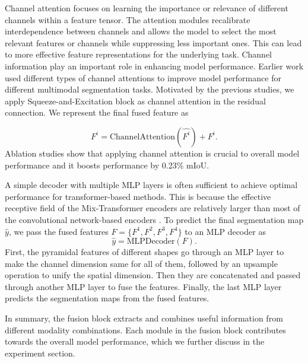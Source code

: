 \documentclass{article}
\begin{document}
Channel attention focuses on learning the importance or relevance of different channels within a feature tensor. The attention modules recalibrate  interdependence between channels and allows the model to select the most relevant features or channels while suppressing less important ones. This can lead to more effective feature representations for the underlying task. Channel information play an important role in enhancing model performance. Earlier work \cite{hu2019acnet, chen2020sa-gate, zhang2023cmx}  used different types of channel attentions to improve model performance for different multimodal segmentation tasks. Motivated by the previous studies, we apply Squeeze-and-Excitation block \cite{hu2019squeezeandexcitation} as channel attention in the residual connection.
We represent the final fused feature as 

\begin{equation}\label{eq:residual}
    F^i = \text{ChannelAttention}(\hat{F^i}) + F^i.
\end{equation}
Ablation studies show that applying channel attention is crucial to overall model performance and it boosts performance by 0.23\% mIoU. 


A simple decoder with multiple MLP layers is often sufficient to achieve optimal performance for transformer-based methods. This is because the effective receptive field of the Mix-Transformer encoders are relatively larger than most of the convolutional network-based encoders \cite{xie2021segformer}. To predict the final segmentation map $\hat y$, we pass the fused features $F = \{F^1, F^2, F^3, F^4\}$ to an MLP decoder as 
\begin{equation}\label{eq:y}
    \hat{y} = \text{MLPDecoder}(F). 
\end{equation}
First, the pyramidal features of different shapes go through an MLP layer to make the channel dimension same for all of them, followed by an upsample operation to unify the spatial dimension. Then they are concatenated and passed through another MLP layer to fuse the features. Finally, the last MLP layer predicts the segmentation maps from the fused features. 

In summary, the fusion block extracts and combines useful information from different modality combinations. Each module in the fusion block contributes towards the overall model performance, which we further discuss in the experiment section. 
\end{document}
